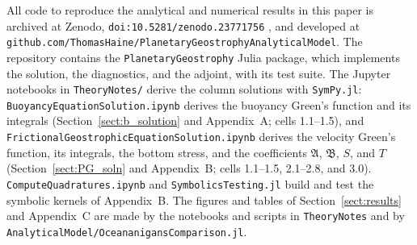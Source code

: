 \documentclass{ametsocV6.2}
\begin{document}
\datastatement
All code to reproduce the analytical and numerical results in this paper is archived at Zenodo, \texttt{doi:10.5281/zenodo.23771756} \citep{haine26}, and developed at \texttt{github.com/ThomasHaine/PlanetaryGeostrophyAnalyticalModel}.
The repository contains the \texttt{PlanetaryGeostrophy} Julia package, which implements the solution, the diagnostics, and the adjoint, with its test suite.
The Jupyter notebooks in \texttt{TheoryNotes/} derive the column solutions with \texttt{SymPy.jl}: \texttt{BuoyancyEquationSolution.ipynb} derives the buoyancy Green's function and its integrals (Section~\ref{sect:b_solution} and Appendix~A; cells 1.1--1.5), and \texttt{FrictionalGeostrophicEquationSolution.ipynb} derives the velocity Green's function, its integrals, the bottom stress, and the coefficients $\mathfrak{A}$, $\mathfrak{B}$, $S$, and $T$ (Section~\ref{sect:PG_soln} and Appendix~B; cells 1.1--1.5, 2.1--2.8, and 3.0).
\texttt{ComputeQuadratures.ipynb} and \texttt{SymbolicsTesting.jl} build and test the symbolic kernels of Appendix~B.
The figures and tables of Section~\ref{sect:results} and Appendix~C are made by the notebooks and scripts in \texttt{TheoryNotes} and by \texttt{AnalyticalModel/OceananigansComparison.jl}.


\appendix[A]
\end{document}
